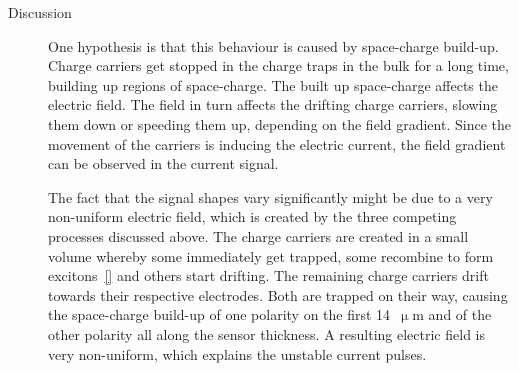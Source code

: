 \begin{description}
\item[Discussion] One hypothesis is that this behaviour is caused by space-charge build-up. Charge carriers get stopped in the charge traps in the bulk for a long time, building up regions of space-charge. The built up space-charge affects the electric field. The field in turn affects the drifting charge carriers, slowing them down or speeding them up, depending on the field gradient. Since the movement of the carriers is inducing the electric current, the field gradient can be observed in the current signal. 

The fact that the signal shapes vary significantly might be due to a very non-uniform electric field, which is created by the three competing processes discussed above. The charge carriers are created in a small volume whereby some immediately get trapped, some recombine to form excitons~\ref{} and others start drifting. The remaining charge carriers drift towards their respective electrodes. Both are trapped on their way, causing the space-charge build-up of one polarity on the first 14~$\upmu$m and of the other polarity all along the sensor thickness. A resulting electric field is very non-uniform, which explains the unstable current pulses. 
\end{description}







